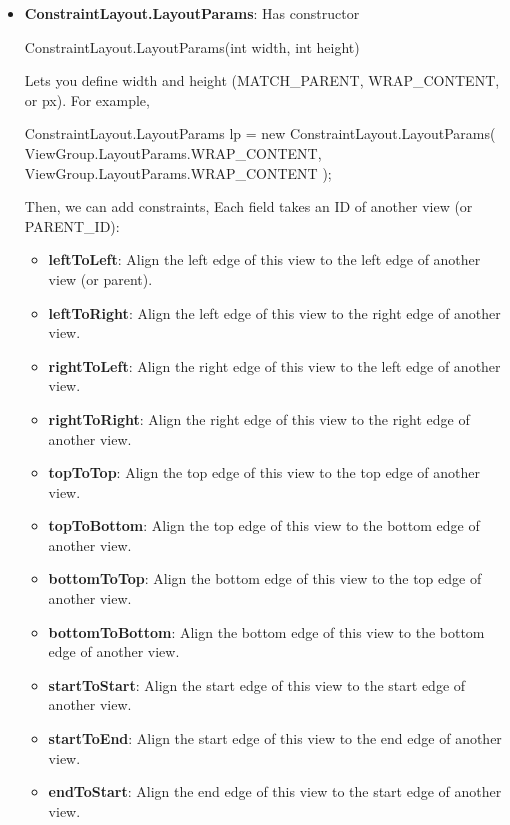 \documentclass{report}
\begin{document}
\begin{itemize}
        \item \textbf{ConstraintLayout.LayoutParams}: Has constructor
            \bigbreak \noindent 
            \begin{javacode}
            ConstraintLayout.LayoutParams(int width, int height)
            \end{javacode}
            Lets you define width and height (MATCH\_PARENT, WRAP\_CONTENT, or px).
            \bigbreak \noindent 
            For example,
            \bigbreak \noindent 
            \begin{javacode}
                ConstraintLayout.LayoutParams lp =
                    new ConstraintLayout.LayoutParams(
                    ViewGroup.LayoutParams.WRAP_CONTENT,
                    ViewGroup.LayoutParams.WRAP_CONTENT
                );
            \end{javacode}
            Then, we can add constraints, Each field takes an ID of another view (or PARENT\_ID):
            \begin{itemize}
                \item \textbf{leftToLeft}: Align the left edge of this view to the left edge of another view (or parent).
                \item \textbf{leftToRight}: Align the left edge of this view to the right edge of another view.
                \item \textbf{rightToLeft}: Align the right edge of this view to the left edge of another view.
                \item \textbf{rightToRight}: Align the right edge of this view to the right edge of another view.
                \item \textbf{topToTop}: Align the top edge of this view to the top edge of another view.
                \item \textbf{topToBottom}: Align the top edge of this view to the bottom edge of another view.
                \item \textbf{bottomToTop}: Align the bottom edge of this view to the top edge of another view.
                \item \textbf{bottomToBottom}: Align the bottom edge of this view to the bottom edge of another view.
                \item \textbf{startToStart}: Align the start edge of this view to the start edge of another view.
                \item \textbf{startToEnd}: Align the start edge of this view to the end edge of another view.
                \item \textbf{endToStart}: Align the end edge of this view to the start edge of another view.

\end{itemize}
\end{itemize}
\end{document}
